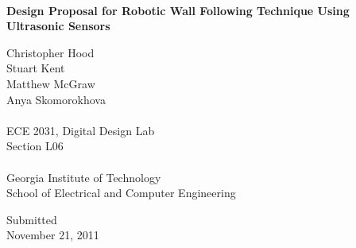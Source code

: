 \begin{titlepage}
\center

\hspace{0.5in}\\

\huge
\textbf{Design Proposal for Robotic Wall Following Technique Using Ultrasonic Sensors}\\

\vspace{0.75in}

\LARGE
Christopher Hood\\
Stuart Kent\\
Matthew McGraw\\
Anya Skomorokhova\\
\hspace{1in}\\


ECE 2031, Digital Design Lab\\
Section L06\\
\hspace{1in}\\

\Large
Georgia Institute of Technology\\
School of Electrical and Computer Engineering\\

\vspace{1in}

\large 
Submitted\\
November 21, 2011\\

\end{titlepage}